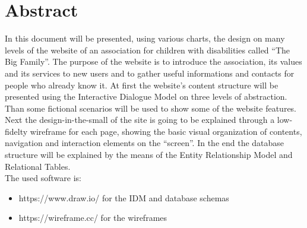 %
%
%
\chapter{Abstract}
%
%
%
In this document will be presented, using various charts, the design on many levels of the website of an association for children with disabilities called ``The Big Family''. The purpose of the website is to introduce the association, its values and its services to new users and to gather useful informations and contacts for people who already know it.
\linebreak
\linebreak
At first the website's content structure will be presented using the Interactive Dialogue Model on three levels of abstraction. Than some fictional scenarios will be used to show some of the website features. Next the design-in-the-small of the site is going to be explained through a low-fidelty wireframe for each page, showing the basic visual organization of contents, navigation and interaction elements on the “screen”. In the end the database structure will be explained by the means of the Entity Relationship Model and Relational Tables.\\
\linebreak
The used software is:
\begin{itemize}

\item https://www.draw.io/ for the IDM and database schemas
\item https://wireframe.cc/ for the wireframes

\end{itemize}
%
